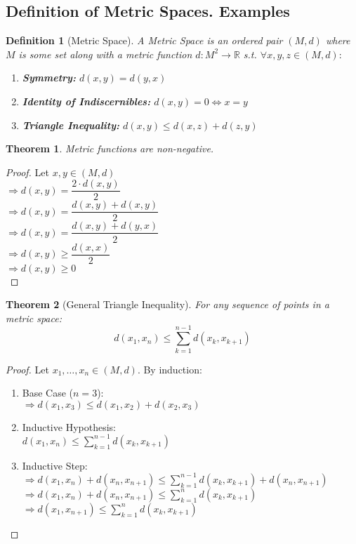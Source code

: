 \documentclass{article}
\newtheorem{definition}{Definition}[section]
\newtheorem{theorem}{Theorem}[section]
\begin{document}
		\subsection{Definition of Metric Spaces. Examples}
			\begin{definition}[Metric Space]
				A Metric Space is an ordered pair $(M, d)$ where $M$ is some set along with a metric function $d \colon M^2 \to \mathbb{R}$ s.t. $\forall x, y, z \in (M, d):$
				\begin{enumerate}
					\item \textbf{Symmetry:} $d(x, y) = d(y, x)$
					\item \textbf{Identity of Indiscernibles:} $d(x, y) = 0 \Leftrightarrow x=y$
					\item \textbf{Triangle Inequality:} $d(x, y) \leq d(x, z) + d(z, y)$
				\end{enumerate}
			\end{definition}
		
			\begin{theorem}
				Metric functions are non-negative.
			\end{theorem}
			\begin{proof}
				Let $x, y \in (M, d)$\\
				$\Rightarrow d(x, y) = \dfrac{2 \cdot d(x, y)}{2}$\\
				$\Rightarrow d(x, y) = \dfrac{d(x, y) + d(x, y)}{2}$\\
				$\Rightarrow d(x, y) = \dfrac{d(x, y) + d(y, x)}{2}$\\
				$\Rightarrow d(x, y) \geq \dfrac{d(x, x)}{2}$\\
				$\Rightarrow d(x, y) \geq 0$\\
			\end{proof}

			\begin{theorem}[General Triangle Inequality]
			\label{general triangle inequality}
				For any sequence of points in a metric space:
				$$d(x_1,x_n) \leq \sum\limits_{k=1}^{n-1} d(x_k,x_{k+1})$$
			\end{theorem}
			\begin{proof}
				Let $x_1, \ldots, x_n \in (M, d)$. By induction:\\
				\begin{enumerate}
					\item Base Case ($n = 3$):\\
						$\Rightarrow d(x_1, x_3) \leq d(x_1, x_2) + d(x_2, x_3)$
					\item Inductive Hypothesis:\\
						$d(x_1,x_n) \leq \sum\limits_{k=1}^{n-1} d(x_k,x_{k+1})$
					\item Inductive Step:\\
						$\Rightarrow d(x_1,x_n) + d(x_n,x_{n+1}) \leq \sum\limits_{k=1}^{n-1}  d(x_k,x_{k+1}) + d(x_n,x_{n+1})$\\
						$\Rightarrow d(x_1,x_n) + d(x_n,x_{n+1}) \leq \sum\limits_{k=1}^n  d(x_k,x_{k+1})$\\
						$\Rightarrow d(x_1,x_{n+1}) \leq \sum\limits_{k=1}^{n} d(x_k,x_{k+1})$
					\end{enumerate}
			\end{proof}
\end{document}
